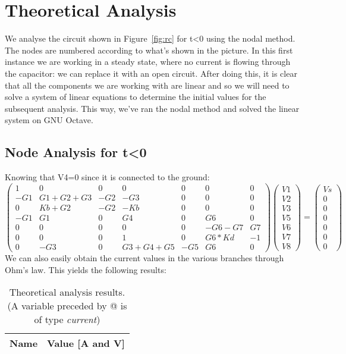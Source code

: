 \section{Theoretical Analysis}
\label{sec:analysis}

We analyse the circuit shown in Figure~\ref{fig:rc} for t<0 using the nodal method.
The nodes are numbered according to what's shown in the picture.
In this first instance we are working in a steady state, where no current is flowing through the capacitor: we can replace it with an open circuit.
After doing this, it is clear that all the components we are working with are linear and so we will need to solve a system of linear equations to determine the initial values for the subsequent analysis.
This way, we’ve ran the nodal method and solved the linear system on GNU Octave.
\subsection{Node Analysis for t<0}
Knowing that V4=0 since it is connected to the ground:
\begin{equation}
\begin{pmatrix}
1 & 0 & 0 & 0 & 0 & 0 & 0\\
-G1 & G1+G2+G3 & -G2 & -G3 & 0 & 0 & 0\\
0 & Kb+G2 & -G2 & -Kb & 0 & 0 & 0\\
-G1 & G1 & 0 & G4 & 0 & G6 & 0\\
0 & 0 & 0 & 0 & 0 & -G6-G7 & G7\\
0 & 0 & 0 & 1 & 0 & G6*Kd & -1\\
0 & -G3 & 0 & G3+G4+G5 & -G5 & G6 & 0
\end{pmatrix}
\begin{pmatrix}
V1\\
V2\\
V3\\
V5\\
V6\\
V7\\
V8
\end{pmatrix}
=
\begin{pmatrix}
Vs\\
0\\
0\\
0\\
0\\
0\\
0
\end{pmatrix}
\end{equation}
We can also easily obtain the current values in the various branches through Ohm's law. This yields the following results:
\begin{table}[h]
  \centering
  \begin{tabular}{|l|r|}
    \hline    
    {\bf Name} & {\bf Value [A and V]} \\ \hline
     
  \end{tabular}
  \caption{Theoretical analysis results. (A variable preceded by @ is of type {\em current})}
  \label{tab:nodal}
\end{table}

